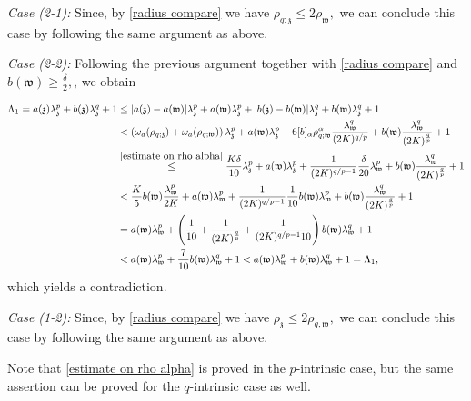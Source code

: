 \documentclass[11pt,oneside, english,reqno,twoside a4paper]{amsart}
\theoremstyle{definition}
\numberwithin{theorem}{section}
\numberwithin{equation}{section}
\begin{document}
\noindent \textit{Case (2-1):} Since, by \eqref{radius compare} we have $\rho_{q; \mathfrak{z}}\leq 2\rho_{\mathfrak{w}},$ we can conclude this case by following the same argument as above.


\noindent \textit{Case (2-2):} Following the previous argument together with \eqref{radius compare} and $b(\mathfrak{w})\geq \frac{\delta}{2},$, we obtain 

\begin{align*}
\Lambda_1=a(\mathfrak{z})\lambda^p_{\mathfrak{z}}+b(\mathfrak{z})\lambda^q_{\mathfrak{z}}+1&\leq |a(\mathfrak{z})-a(\mathfrak{w})|\lambda^p_{\mathfrak{z}}+a(\mathfrak{w})\lambda^p_{\mathfrak{z}}+|b(\mathfrak{z})-b(\mathfrak{w})|\lambda^q_{\mathfrak{z}}+b(\mathfrak{w})\lambda^q_{\mathfrak{z}}+1\\
&<\left(\omega_{a}(\rho_{q; \mathfrak{z}})+\omega_{a}(\rho_{q; \mathfrak{w}})\right)\lambda^p_{\mathfrak{z}}+ a(\mathfrak{w})\lambda^p_{\mathfrak{z}}+ 6[b]_{\alpha}\rho^{\alpha}_{q;\mathfrak{w}}\frac{\lambda^q_{\mathfrak{w}}}{(2K)^{q/p}}+b(\mathfrak{w})\frac{\lambda^q_{\mathfrak{w}}}{(2K)^{\frac{q}{p}}}+1\\ &\overset{\eqref{estimate on rho alpha}}{\leq} \frac{K \delta}{10}\lambda^p_{\mathfrak{z}}+ a(\mathfrak{w})\lambda^p_{\mathfrak{z}}+\frac{1}{(2K)^{q/p-1}}\frac{\delta}{20}\lambda^p_{\mathfrak{w}}+b(\mathfrak{w})\frac{\lambda^q_{\mathfrak{w}}}{(2K)^{\frac{q}{p}}}+1\\
&< \frac{K}{5}b(\mathfrak{w})\frac{\lambda^p_{\mathfrak{w}}}{2K}+a(\mathfrak{w})\lambda^p_{\mathfrak{w}}+\frac{1}{(2K)^{q/p-1}}\frac{1}{10}b(\mathfrak{w})\lambda^p_{\mathfrak{w}}+b(\mathfrak{w})\frac{\lambda^q_{\mathfrak{w}}}{(2K)^{\frac{q}{p}}}+1\\
&=a(\mathfrak{w})\lambda^p_{\mathfrak{w}}+\left(\frac{1}{10}+\frac{1}{(2K)^{\frac{q}{p}}}+\frac{1}{(2K)^{q/p-1}10}\right)b(\mathfrak{w})\lambda^q_{\mathfrak{w}}+1\\
&<a(\mathfrak{w})\lambda^p_{\mathfrak{w}}+\frac{7}{10}b(\mathfrak{w})\lambda^q_{\mathfrak{w}}+1<a(\mathfrak{w})\lambda^p_{\mathfrak{w}}+b(\mathfrak{w})\lambda^q_{\mathfrak{w}}+1=\Lambda_1,
\end{align*}
which yields a contradiction. 

\noindent \textit{Case (1-2):} Since, by \eqref{radius compare} we have $\rho_{\mathfrak{z}}\leq 2\rho_{q, \mathfrak{w}},$ we can conclude this case by following the same argument as above.

Note that \eqref{estimate on rho alpha} is proved in the $p$-intrinsic case, but the same assertion can be proved for the $q$-intrinsic case as well.
\end{document}
